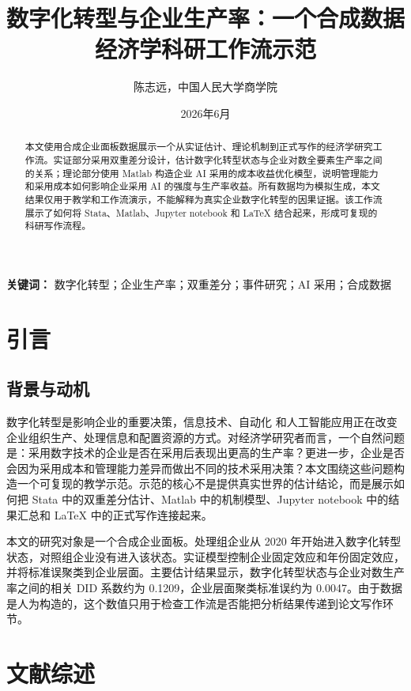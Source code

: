 \documentclass[11pt]{ctexart}
\title{数字化转型与企业生产率：一个合成数据经济学科研工作流示范}
\author{陈志远，中国人民大学商学院}
\date{2026年6月}
\begin{document}
\maketitle

\begin{abstract}
本文使用合成企业面板数据展示一个从实证估计、理论机制到正式写作的经济学研究工作流。实证部分采用双重差分设计，估计数字化转型状态与企业对数全要素生产率之间的关系；理论部分使用 Matlab 构造企业 AI 采用的成本收益优化模型，说明管理能力和采用成本如何影响企业采用 AI 的强度与生产率收益。所有数据均为模拟生成，本文结果仅用于教学和工作流演示，不能解释为真实企业数字化转型的因果证据。该工作流展示了如何将 Stata、Matlab、Jupyter notebook 和 \LaTeX{} 结合起来，形成可复现的科研写作流程。



\end{abstract}

\noindent\textbf{关键词：} 数字化转型；企业生产率；双重差分；事件研究；AI 采用；合成数据

\section{引言}
\subsection{背景与动机}

数字化转型是影响企业的重要决策，信息技术、自动化
和人工智能应用正在改变企业组织生产、处理信息和配置资源的方式。对经济学研究者而言，一个自然问题是：采用数字技术的企业是否在采用后表现出更高的生产率？更进一步，企业是否会因为采用成本和管理能力差异而做出不同的技术采用决策？本文围绕这些问题构造一个可复现的教学示范。示范的核心不是提供真实世界的估计结论，而是展示如何把 Stata 中的双重差分估计、Matlab 中的机制模型、Jupyter notebook 中的结果汇总和 \LaTeX{} 中的正式写作连接起来。

本文的研究对象是一个合成企业面板。处理组企业从 2020 年开始进入数字化转型状态，对照组企业没有进入该状态。实证模型控制企业固定效应和年份固定效应，并将标准误聚类到企业层面。主要估计结果显示，数字化转型状态与企业对数生产率之间的相关 DID 系数约为 0.1209，企业层面聚类标准误约为 0.0047。由于数据是人为构造的，这个数值只用于检查工作流是否能把分析结果传递到论文写作环节。



\section{文献综述}
\end{document}
